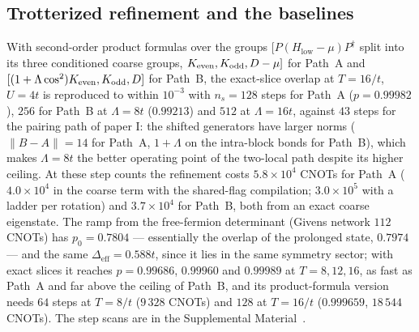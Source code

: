 \documentclass[a4paper,11pt,noarxiv]{quantumarticle}
\newcommand{\Hlow}{H_{\mathrm{low}}}
\newcommand{\Deff}{\Delta_{\mathrm{eff}}}
\newcommand{\SM}{Supplemental Material~\cite{SM}}
\begin{document}
\subsection{Trotterized refinement and the baselines}
With second-order product formulas over the groups
$[P(\Hlow-\mu)P^\dagger$ split into its three conditioned coarse groups,
$K_{\rm even},K_{\rm odd},D-\mu]$ for Path~A and
$[(1+\Lambda\cos^2)K_{\rm even},K_{\rm odd},D]$ for Path~B, the exact-slice
overlap at $T=16/t$, $U=4t$ is reproduced to within $10^{-3}$ with
$n_s=128$ steps for Path~A ($p=0.99982$), $256$ for Path~B at $\Lambda=8t$
($0.99213$) and $512$ at $\Lambda=16t$, against $43$ steps for the pairing
path of paper I: the shifted generators have larger norms ($\|B-A\|=14$ for
Path~A, $1+\Lambda$ on the intra-block bonds for Path~B), which makes
$\Lambda=8t$ the better operating point of the two-local path despite its
higher ceiling.  At these step counts the refinement costs
$5.8\times10^4$ CNOTs for Path~A ($4.0\times10^4$ in the coarse term with
the shared-flag compilation; $3.0\times10^5$ with a ladder per rotation)
and $3.7\times10^4$ for Path~B, both from an exact coarse eigenstate.  The ramp from the free-fermion determinant
(Givens network $112$ CNOTs) has $p_0=0.7804$ --- essentially the overlap
of the prolonged state, $0.7974$ --- and the same $\Deff=0.588t$, since it
lies in the same symmetry sector; with exact slices it reaches
$p=0.99686$, $0.99960$ and $0.99989$ at $T=8,12,16$, as fast as Path~A and
far above the ceiling of Path~B, and its product-formula version needs
$64$ steps at $T=8/t$ ($9\,328$ CNOTs) and $128$ at $T=16/t$
($0.999659$, $18\,544$ CNOTs).  The step scans are in the \SM.
\end{document}
